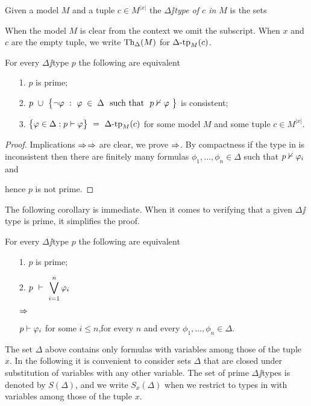 \documentclass[creche.tex]{subfiles}
\begin{document}
Given a model $M$ and a tuple $c\in M^{|x|}$ the \emph{$\Delta\jj$type of $c$ in $M$\/} is the sets


When the model $M$ is clear from the context we omit the subscript.
When $x$ and $c$ are the empty tuple, we write \emph{$\textrm{Th}_\Delta(M)$} for $\Delta\mbox{-}\textrm{tp}_M(c)$.

\begin{lemma}\label{lemmatipiprimiconsistenti}
For every $\Delta\jj$type $p$ the following are equivalent
\begin{itemize}
\item[1.] $p$ is prime;
\item[2.] $p\ \cup\ \big\{\neg\phi\ :\  \phi\;\in\;\Delta\ \ \textrm{such that}\ \ p\notproves\phi\ \big\}$ is consistent;
\item[3.] $\big\{\phi\in\Delta : p\proves\phi\big\}\ = \ \Deltatp_M(c)$ for some model $M$ and some tuple $c\in M^{|x|}$.
\end{itemize}
\end{lemma}
\begin{proof}
Implications $\Rightarrow$$\Rightarrow$ are clear, we prove $\Rightarrow$.
By compactness if the type in  is inconsistent then there are finitely many formulas $\phi_1,\dots,\phi_n\in\Delta$ such that $p\nvdash\varphi_i$ and


hence $p$ is not prime.
\end{proof}

The following corollary is immediate.
When it comes to verifying that a given $\Delta\jj$type is prime, it simplifies the proof.

\begin{corollary}\label{coroll_test_primalita}
For every $\Delta\jj$type $p$ the following are equivalent
\begin{itemize}
\item[1.] $p$ is prime;
\item[2.] $\displaystyle p\ \proves\ \bigvee^n_{i=1}\phi_i$\parbox{6ex}{\hfil$\Rightarrow$}$p\vdash\varphi_i$ for some $i\le n$,\hfill for every $n$ and every $\phi_1,\dots,\phi_n\in\Delta$.\QED
\end{itemize}
\end{corollary}

The set $\Delta$ above contains only formulas with variables among those of the tuple $x$.
In the following it is convenient to consider sets $\Delta$ that are closed under substitution of variables with any other variable.
The set of prime $\Delta\jj$types is denoted by \emph{$S(\Delta)$}, and we write \emph{$S_x(\Delta)$\/} when we restrict to types in with variables among those of the tuple $x$.
\end{document}

